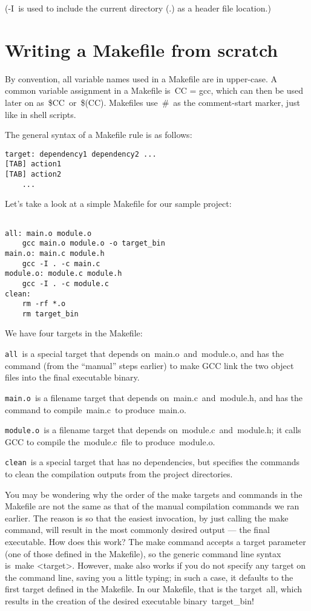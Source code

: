 \documentclass[output=paper, 
colorlinks,
citecolor=brown,
newtxmath
]{langscibook}
\begin{document}
(-I is used to include the current directory (.) as a header file location.)

\section {Writing a Makefile from scratch}

By convention, all variable names used in a Makefile are in upper-case. A common variable assignment in a Makefile is CC = gcc, which can then be used later on as \${CC} or \$(CC). Makefiles use \# as the comment-start marker, just like in shell scripts.

The general syntax of a Makefile rule is as follows:

\begin{verbatim}
target: dependency1 dependency2 ...
[TAB] action1
[TAB] action2
    ...
\end{verbatim}

Let’s take a look at a simple Makefile for our sample project:

\begin{verbatim}

all: main.o module.o
    gcc main.o module.o -o target_bin
main.o: main.c module.h
    gcc -I . -c main.c
module.o: module.c module.h
    gcc -I . -c module.c
clean:
    rm -rf *.o
    rm target_bin
\end{verbatim}

We have four targets in the Makefile:

\texttt{all} is a special target that depends on main.o and module.o, and has the command (from the “manual” steps earlier) to make GCC link the two object files into the final executable binary.

\texttt{main.o} is a filename target that depends on main.c and module.h, and has the command to compile main.c to produce main.o.

\texttt{module.o} is a filename target that depends on module.c and module.h; it calls GCC to compile the module.c file to produce module.o.

\texttt{clean} is a special target that has no dependencies, but specifies the commands to clean the compilation outputs from the project directories.

You may be wondering why the order of the make targets and commands in the Makefile are not the same as that of the manual compilation commands we ran earlier. The reason is so that the easiest invocation, by just calling the make command, will result in the most commonly desired output — the final executable. How does this work?
The make command accepts a target parameter (one of those defined in the Makefile), so the generic command line syntax is make <target>. However, make also works if you do not specify any target on the command line, saving you a little typing; in such a case, it defaults to the first target defined in the Makefile. In our Makefile, that is the target all, which results in the creation of the desired executable binary target\_bin!
\end{document}
